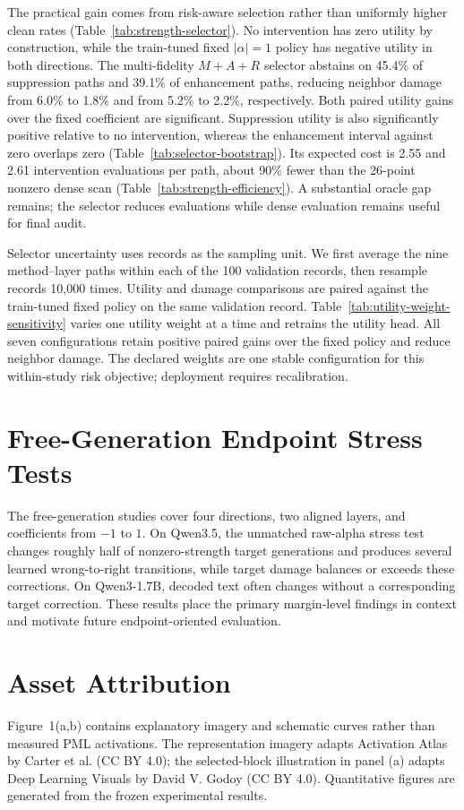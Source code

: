 The practical gain comes from risk-aware selection rather than uniformly higher
clean rates (Table~\ref{tab:strength-selector}). No intervention has zero
utility by construction, while the train-tuned fixed $|\alpha|=1$ policy has
negative utility in both directions. The multi-fidelity $M+A+R$ selector abstains on
45.4\% of suppression paths and 39.1\% of enhancement paths, reducing neighbor
damage from 6.0\% to 1.8\% and from 5.2\% to 2.2\%, respectively. Both paired
utility gains over the fixed coefficient are significant. Suppression utility
is also significantly positive relative to no intervention, whereas the
enhancement interval against zero overlaps zero
(Table~\ref{tab:selector-bootstrap}). Its expected cost is 2.55 and 2.61
intervention evaluations per path, about 90\% fewer than the 26-point nonzero dense scan
(Table~\ref{tab:strength-efficiency}). A substantial oracle gap remains; the
selector reduces evaluations while dense evaluation remains useful for final
audit.






Selector uncertainty uses records as the sampling unit. We first average the
nine method--layer paths within each of the 100 validation records, then
resample records 10,000 times. Utility and damage comparisons are paired
against the train-tuned fixed policy on the same validation record.
Table~\ref{tab:utility-weight-sensitivity} varies one utility weight at a time
and retrains the utility head. All seven configurations retain positive paired
gains over the fixed policy and reduce neighbor damage. The declared weights are
one stable configuration for this within-study risk objective; deployment
requires recalibration.

\section{Free-Generation Endpoint Stress Tests}

The free-generation studies cover four directions, two aligned layers, and
coefficients from $-1$ to $1$. On Qwen3.5, the unmatched raw-alpha stress test
changes roughly half of nonzero-strength target generations and produces
several learned wrong-to-right transitions, while target damage balances or
exceeds these corrections. On Qwen3-1.7B, decoded text often changes without a
corresponding target correction. These results place the primary margin-level
findings in context and motivate future endpoint-oriented evaluation.



\section{Asset Attribution}
Figure~1(a,b) contains explanatory imagery and schematic curves rather than
measured PML activations. The representation imagery adapts Activation Atlas
by Carter et al. (CC BY 4.0); the selected-block illustration in panel (a)
adapts Deep Learning Visuals by David V. Godoy (CC BY 4.0).
Quantitative figures are generated from the frozen experimental results.
